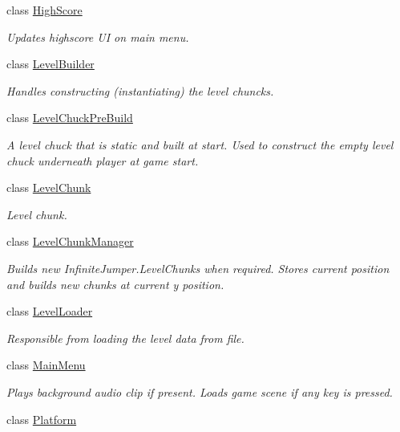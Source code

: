\begin{DoxyCompactItemize}
class \hyperlink{class_infinite_jumper_1_1_high_score}{High\+Score}
\begin{DoxyCompactList}\small\item\em Updates highscore U\+I on main menu. \end{DoxyCompactList}\item 
class \hyperlink{class_infinite_jumper_1_1_level_builder}{Level\+Builder}
\begin{DoxyCompactList}\small\item\em Handles constructing (instantiating) the level chuncks. \end{DoxyCompactList}\item 
class \hyperlink{class_infinite_jumper_1_1_level_chuck_pre_build}{Level\+Chuck\+Pre\+Build}
\begin{DoxyCompactList}\small\item\em A level chuck that is static and built at start. Used to construct the empty level chuck underneath player at game start. \end{DoxyCompactList}\item 
class \hyperlink{class_infinite_jumper_1_1_level_chunk}{Level\+Chunk}
\begin{DoxyCompactList}\small\item\em Level chunk. \end{DoxyCompactList}\item 
class \hyperlink{class_infinite_jumper_1_1_level_chunk_manager}{Level\+Chunk\+Manager}
\begin{DoxyCompactList}\small\item\em Builds new Infinite\+Jumper.\+Level\+Chunks when required. Stores current position and builds new chunks at current y position. \end{DoxyCompactList}\item 
class \hyperlink{class_infinite_jumper_1_1_level_loader}{Level\+Loader}
\begin{DoxyCompactList}\small\item\em Responsible from loading the level data from file. \end{DoxyCompactList}\item 
class \hyperlink{class_infinite_jumper_1_1_main_menu}{Main\+Menu}
\begin{DoxyCompactList}\small\item\em Plays background audio clip if present. Loads game scene if any key is pressed. \end{DoxyCompactList}\item 
class \hyperlink{class_infinite_jumper_1_1_platform}{Platform}

\end{DoxyCompactItemize}
